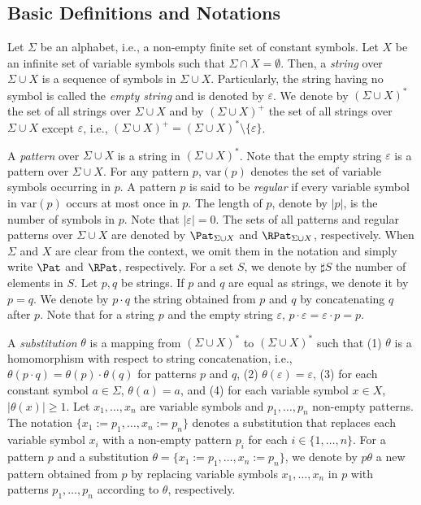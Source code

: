 
\subsection{Basic Definitions and Notations}\label{subsec:basicdef}

Let $\Sigma$ be {\color{black} an alphabet, i.e.,} a non-empty finite set of constant symbols.
Let $X$ be an infinite set of variable symbols
such that $\Sigma \cap X = \emptyset$.
Then, a \textit{string} {\color{black}over} $\Sigma \cup X$ is a sequence of symbols in $\Sigma \cup X$.
Particularly, the string having no symbol is called the \textit{empty string} and is denoted by $\varepsilon$.
We denote by $(\Sigma \cup X)^{\ast}$ the set of all strings {\color{black}over} $\Sigma \cup X$ 
and by $(\Sigma \cup X)^{+}$ the set of all strings {\color{black}over} $\Sigma\cup X$ except $\varepsilon$, i.e., $(\Sigma \cup X)^{+}=(\Sigma \cup X)^{\ast}\setminus \{\varepsilon\}$.

A \textit{pattern} {\color{black}over} $\Sigma \cup X$ is a string in $(\Sigma \cup X)^{\ast}$.
Note that the empty string $\varepsilon$ is a pattern {\color{black}over} $\Sigma \cup X$.
{\color{red} For any pattern $p$, $\mathrm{var}(p)$ denotes the set of variable symbols occurring in $p$.
A pattern $p$ is said to be \textit{regular} if every variable symbol in $\mathrm{var}(p)$ occurs at most once in $p$.}
The length of $p$, denote by $|p|$, is the number of symbols in $p$.
Note that $|\varepsilon|=0$.
{\color{black} The sets of all patterns and regular patterns {\color{black}over} $\Sigma \cup X$ are denoted by $\Pat_{\Sigma\cup X}$ and $\RPat_{\Sigma\cup X}$, respectively.
When $\Sigma$ and $X$ are clear from the context, 
we omit them in the notation and simply write $\Pat$ and $\RPat$, respectively.}
For a set $S$, we denote by $\sharp S$ the number of elements in $S$.
Let $p,q$ be strings.
If $p$ and $q$ are equal as strings, we denote it by $p=q$.
We denote by $p\cdot q$ the string obtained from $p$ and $q$ by concatenating $q$ after $p$.
Note that for a string $p$ and the empty string $\varepsilon$, $p\cdot \varepsilon = \varepsilon \cdot p = p$.

A {\color{black} \textit{substitution}} $\theta$ is a mapping from $(\Sigma \cup X)^{\ast}$ to $(\Sigma \cup X)^{\ast}$ such that
(1) $\theta$ is a homomorphism with respect to string concatenation, i.e., $\theta(p \cdot q) = \theta(p) \cdot \theta(q)$ for patterns $p$ and $q$,
(2) $\theta(\varepsilon)=\varepsilon$,
(3) for each constant symbol $a \in \Sigma$, $\theta(a) = a$,
and (4) for each variable symbol $x \in X$, $|\theta(x)| \geq 1$.
Let $x_{1},\ldots,x_{n}$ are variable symbols and $p_{1},\ldots,p_{n}$ non-empty patterns.
The notation $\{x_{1}:=p_{1},\ldots,x_{n}:=p_{n}\}$ denotes a substitution that replaces each variable symbol $x_{i}$
with a non-empty pattern $p_{i}$ for each $i \in \{1,\ldots,n\}$.
For a pattern $p$ and a substitution $\theta=\{x_{1}:=p_{1},\ldots,x_{n}:=p_{n}\}$, we denote by $p\theta$ a new pattern obtained from $p$ by replacing variable symbols $x_1,\ldots,x_n$ in $p$ with patterns $p_1,\ldots,p_n$ according to $\theta$, respectively.

